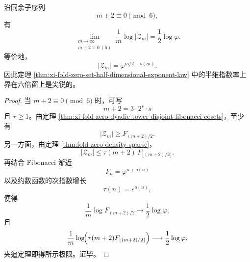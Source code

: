 \begin{corollary}\label{cor:xi-fold-zero-dyadic-tower-sharp-halfdim-exponent}
沿同余子序列
\[
m+2\equiv 0\pmod 6,
\]
有
\[
\lim_{\substack{m\to\infty\\ m+2\equiv 0\ (6)}}
\frac{1}{m}\log|\mathcal Z_m|
=
\frac12\log\varphi.
\]
等价地，
\[
|\mathcal Z_m|=\varphi^{m/2+o(m)}.
\]
因此定理 \ref{thm:xi-fold-zero-set-half-dimensional-exponent-law} 中的半维指数率上界在六倍窗上是尖锐的。
\end{corollary}
\begin{proof}
当 \(m+2\equiv 0\pmod 6\) 时，可写
\[
m+2=3\cdot 2^r\cdot s
\]
且 \(r\ge 1\)。由定理 \ref{thm:xi-fold-zero-dyadic-tower-disjoint-fibonacci-cosets}，至少有
\[
|\mathcal Z_m|
\ge
F_{(m+2)/2}.
\]
另一方面，由定理 \ref{thm:fold-zero-density-sparse}，
\[
|\mathcal Z_m|
\le
\tau(m+2)\,F_{\lfloor (m+2)/2\rfloor}.
\]
再结合 Fibonacci 渐近
\[
F_n=\varphi^{n+o(n)}
\]
以及约数函数的次指数增长
\[
\tau(n)=e^{o(n)},
\]
便得
\[
\frac{1}{m}\log F_{(m+2)/2}
\longrightarrow
\frac12\log\varphi,
\]
且
\[
\frac{1}{m}\log\!\Bigl(\tau(m+2)F_{\lfloor (m+2)/2\rfloor}\Bigr)
\longrightarrow
\frac12\log\varphi.
\]
夹逼定理即得所示极限。证毕。
\end{proof}
